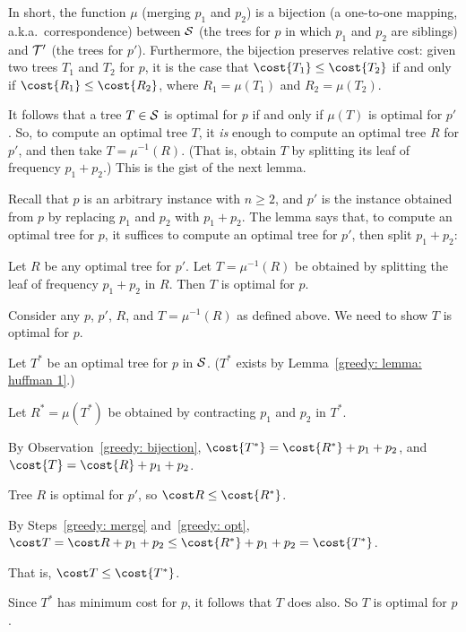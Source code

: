 \smallskip
In short, the function $\mu$ (merging $p_1$ and $p_2$)
is a bijection (a one-to-one mapping, a.k.a.~correspondence)
between ${\cal S}$ (the trees for $p$ in which $p_1$ and $p_2$ are siblings)
and ${\cal T}'$ (the trees for $p'$).
Furthermore, the bijection preserves relative cost:
given two trees $T_1$ and $T_2$ for $p$,
it is the case that
$\cost{T_1} \le \cost{T_2}$
if and only if
$\cost{ R_1} \le \cost{R_2}$,
where $R_1 = \mu(T_1)$ and $R_2 = \mu(T_2)$.

It follows that a tree $T\in{\cal S}$ is optimal for $p$
if and only if
$\mu(T)$ is optimal for $p'$.
So, to compute an optimal tree $T$,
it \emph{is} enough to compute an optimal tree $R$ for $p'$,
and then take $T=\mu^{-1}(R)$.
(That is, obtain $T$ by splitting its leaf of frequency $p_1+p_2$.)
This is the gist of the next lemma.

Recall that $p$ is an arbitrary instance with $n\ge 2$,
and $p'$ is the instance obtained from $p$ by replacing $p_1$ and $p_2$ with $p_1+p_2$.
The lemma says that, to compute an optimal tree for $p$,
it suffices to compute an optimal tree for $p'$, then split $p_1+p_2$:

\begin{lemma}\label{greedy: gc}
  Let $R$ be any optimal tree for $p'$. 
  Let $T = \mu^{-1}(R)$ be obtained by splitting the leaf of frequency $p_1+p_2$ in $R$.
  Then $T$ is optimal for $p$.
\end{lemma}
\begin{longFormProof}
  \step Consider any $p$, $p'$, $R$, and $T=\mu^{-1}(R)$ as defined above.
  We need to show $T$ is optimal for $p$.

  \step Let $T^*$ be an optimal tree for $p$ in ${\cal S}$.
  ($T^*$ exists by Lemma~\ref{greedy: lemma: huffman 1}.)

  \step Let $R^* = \mu(T^*)$ be obtained by contracting $p_1$ and $p_2$ in $T^*$.

   By Observation~\ref{greedy: bijection}, $\cost {T^*} = \cost {R^*} + p_1 + p_2$,
  and $\cost {T} = \cost {R} + p_1 + p_2$. 

   Tree $R$ is optimal for $p'$, so $\cost R \le \cost {R^*}$. 

  \step By Steps~\ref{greedy: merge} and~\ref{greedy: opt},
  \( \cost T = \cost R + p_1 + p_2 \le \cost {R^*} + p_1 + p_2 = \cost {T^*}\).

  \step That is, $\cost T \le \cost {T^*}$.
  
  \step Since $T^*$ has minimum cost for $p$,
  it follows that $T$ does also.  So $T$ is optimal for $p$.
\end{longFormProof}

